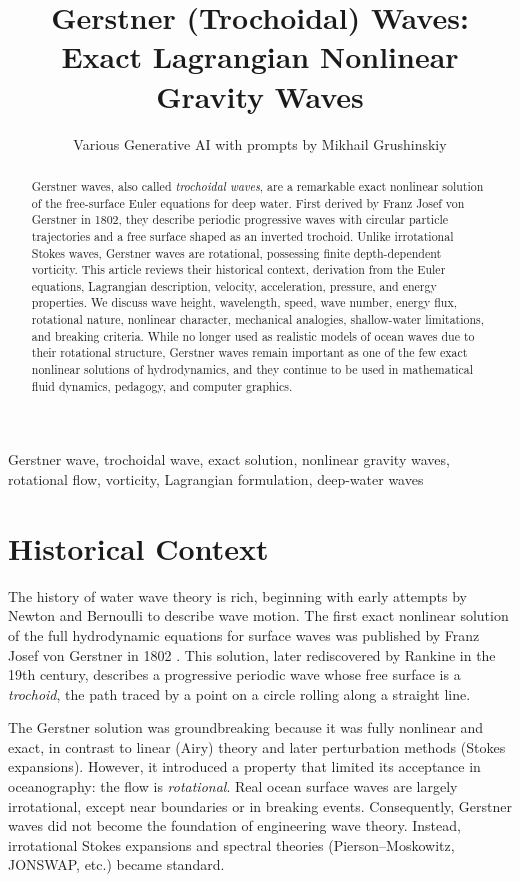 \documentclass[journal,10pt,twocolumn]{IEEEtran}
\title{Gerstner (Trochoidal) Waves:\\
Exact Lagrangian Nonlinear Gravity Waves}
\author{Various Generative AI with prompts by Mikhail Grushinskiy}
\begin{document}
\maketitle

\begin{abstract}
Gerstner waves, also called \emph{trochoidal waves}, are a remarkable exact nonlinear solution of the free-surface Euler equations for deep water. First derived by Franz Josef von Gerstner in 1802, they describe periodic progressive waves with circular particle trajectories and a free surface shaped as an inverted trochoid. Unlike irrotational Stokes waves, Gerstner waves are rotational, possessing finite depth-dependent vorticity. This article reviews their historical context, derivation from the Euler equations, Lagrangian description, velocity, acceleration, pressure, and energy properties. We discuss wave height, wavelength, speed, wave number, energy flux, rotational nature, nonlinear character, mechanical analogies, shallow-water limitations, and breaking criteria. While no longer used as realistic models of ocean waves due to their rotational structure, Gerstner waves remain important as one of the few exact nonlinear solutions of hydrodynamics, and they continue to be used in mathematical fluid dynamics, pedagogy, and computer graphics.
\end{abstract}

\begin{IEEEkeywords}
Gerstner wave, trochoidal wave, exact solution, nonlinear gravity waves, rotational flow, vorticity, Lagrangian formulation, deep-water waves
\end{IEEEkeywords}

\section{Historical Context}

The history of water wave theory is rich, beginning with early attempts by Newton and Bernoulli to describe wave motion. The first exact nonlinear solution of the full hydrodynamic equations for surface waves was published by Franz Josef von Gerstner in 1802 \cite{gerstner1802}. This solution, later rediscovered by Rankine in the 19th century, describes a progressive periodic wave whose free surface is a \emph{trochoid}, the path traced by a point on a circle rolling along a straight line.

The Gerstner solution was groundbreaking because it was fully nonlinear and exact, in contrast to linear (Airy) theory and later perturbation methods (Stokes expansions). However, it introduced a property that limited its acceptance in oceanography: the flow is \emph{rotational}. Real ocean surface waves are largely irrotational, except near boundaries or in breaking events. Consequently, Gerstner waves did not become the foundation of engineering wave theory. Instead, irrotational Stokes expansions and spectral theories (Pierson--Moskowitz, JONSWAP, etc.) became standard.
\end{document}
